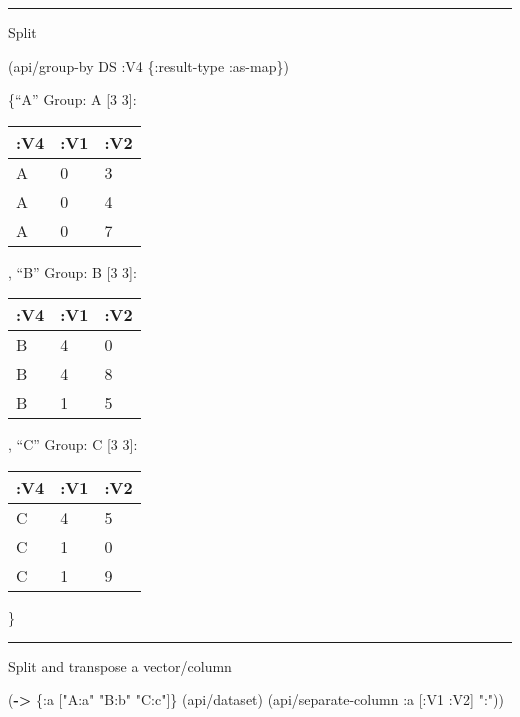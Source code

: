 \documentclass[]{article}
\newenvironment{Shaded}{\begin{snugshade}}{\end{snugshade}}
\newcommand{\KeywordTok}[1]{\textcolor[rgb]{0.13,0.29,0.53}{\textbf{#1}}}
\newcommand{\StringTok}[1]{\textcolor[rgb]{0.31,0.60,0.02}{#1}}
\newcommand{\AttributeTok}[1]{\textcolor[rgb]{0.77,0.63,0.00}{#1}}
\newcommand{\NormalTok}[1]{#1}
\begin{document}
\begin{center}\rule{0.5\linewidth}{0.5pt}\end{center}

Split

\begin{Shaded}
\begin{Highlighting}[]
\NormalTok{(api/group-by DS }\AttributeTok{:V4}\NormalTok{ \{}\AttributeTok{:result-type} \AttributeTok{:as-map}\NormalTok{\})}
\end{Highlighting}
\end{Shaded}

\{``A'' Group: A {[}3 3{]}:

\begin{longtable}[]{@{}lll@{}}
\toprule
:V4 & :V1 & :V2\tabularnewline
\midrule
\endhead
A & 0 & 3\tabularnewline
A & 0 & 4\tabularnewline
A & 0 & 7\tabularnewline
\bottomrule
\end{longtable}

, ``B'' Group: B {[}3 3{]}:

\begin{longtable}[]{@{}lll@{}}
\toprule
:V4 & :V1 & :V2\tabularnewline
\midrule
\endhead
B & 4 & 0\tabularnewline
B & 4 & 8\tabularnewline
B & 1 & 5\tabularnewline
\bottomrule
\end{longtable}

, ``C'' Group: C {[}3 3{]}:

\begin{longtable}[]{@{}lll@{}}
\toprule
:V4 & :V1 & :V2\tabularnewline
\midrule
\endhead
C & 4 & 5\tabularnewline
C & 1 & 0\tabularnewline
C & 1 & 9\tabularnewline
\bottomrule
\end{longtable}

\}

\begin{center}\rule{0.5\linewidth}{0.5pt}\end{center}

Split and transpose a vector/column

\begin{Shaded}
\begin{Highlighting}[]
\NormalTok{(}\KeywordTok{->}\NormalTok{ \{}\AttributeTok{:a}\NormalTok{ [}\StringTok{"A:a"} \StringTok{"B:b"} \StringTok{"C:c"}\NormalTok{]\}}
\NormalTok{    (api/dataset)}
\NormalTok{    (api/separate-column }\AttributeTok{:a}\NormalTok{ [}\AttributeTok{:V1} \AttributeTok{:V2}\NormalTok{] }\StringTok{":"}\NormalTok{))}
\end{Highlighting}
\end{Shaded}
\end{document}
